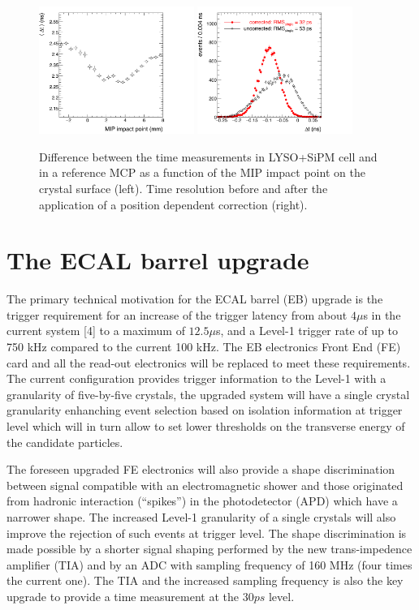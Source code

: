 \begin{figure}
  \centering
  \includegraphics[width = 0.45\textwidth]{figures/upgrade/c_posProfile.png}
  \includegraphics[width = 0.45\textwidth]{figures/upgrade/c_CTR_posCorr.png}
  \caption{Difference between the time measurements in LYSO+SiPM cell and in a reference MCP
    as a function of the MIP impact point on the crystal surface (left).
    Time resolution before and after the application of a position dependent correction (right).}
  \label{fig:btl_time_res}
\end{figure}

\section{The ECAL barrel upgrade}
The primary technical motivation for the ECAL barrel (EB) upgrade is the trigger requirement for
an increase of the trigger latency from about $4\mu$s in the current system [4] to a maximum of $12.5\mu$s,
and a Level-1 trigger rate of up to 750 kHz compared to the current 100 kHz.
The EB electronics Front End (FE) card and all the read-out electronics will be replaced to
meet these requirements. The current configuration provides trigger information to the Level-1
with a granularity of five-by-five crystals, the upgraded system will have a single crystal granularity
enhanching event selection based on isolation information at trigger level which will in turn allow
to set lower thresholds on the transverse energy of the candidate particles.

The foreseen upgraded FE electronics will also provide a shape discrimination between
signal compatible with an electromagnetic shower and those originated from hadronic interaction (``spikes'') in
the photodetector (APD) which have a narrower shape. The increased Level-1 granularity of a single crystals
will also improve the rejection of such events at trigger level.
The shape discrimination is made possible by a shorter signal shaping performed by the new trans-impedence amplifier
(TIA) and by an ADC with sampling frequency of 160 MHz (four times the current one). The TIA and the increased sampling
frequency is also the key upgrade to provide a time measurement at the $30 ps$ level.

